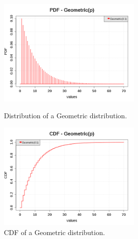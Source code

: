 \begin{figure}[H]
  \begin{minipage}{10cm}
    \begin{center}
      \includegraphics[width=7cm]{pdf_Geometric.png}
      \caption{Distribution of a Geometric distribution.}
      \label{PDFGeometric}
    \end{center}
  \end{minipage}
  \hfill
  \begin{minipage}{10cm}
    \begin{center}
      \includegraphics[width=7cm]{cdf_Geometric.png}
      \caption{CDF of a Geometric distribution.}
      \label{CDFGeometric}
    \end{center}
  \end{minipage}
\end{figure}



